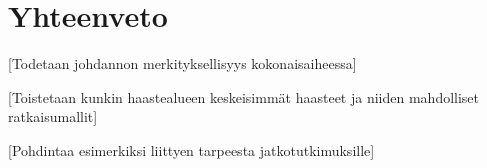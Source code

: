 \chapter{Yhteenveto\label{conclusions}}

[Todetaan johdannon merkityksellisyys kokonaisaiheessa]

[Toistetaan kunkin haastealueen keskeisimmät haasteet ja niiden mahdolliset ratkaisumallit]

[Pohdintaa esimerkiksi liittyen tarpeesta jatkotutkimuksille]